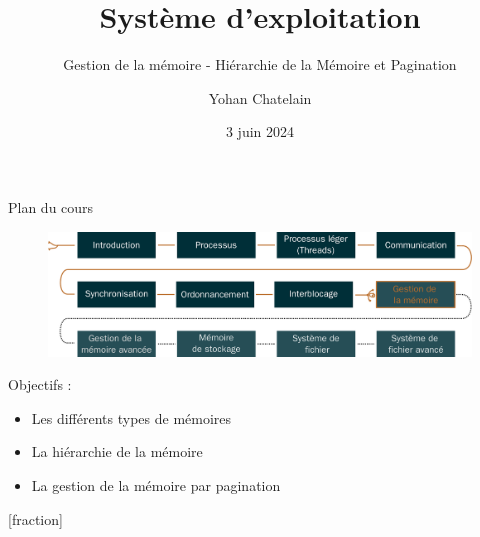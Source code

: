\documentclass[8pt]{beamer}
\title{Système d'exploitation}
\subtitle{Gestion de la mémoire - Hiérarchie de la Mémoire et Pagination}
\author{Yohan Chatelain}
\institute{Polytechnique Montr\'eal}
\date{3 juin 2024}
\begin{document}
\begin{frame}
    \titlepage
\end{frame}

\begin{frame}{Plan du cours}
    \begin{figure}
        \centering
        \includegraphics[width=\textwidth]{figures/plan_cours.pdf}
    \end{figure}
    \vfill
    \begin{block}{Objectifs : }

        \begin{itemize}
            \item Les différents types de mémoires
            \item La hiérarchie de la mémoire
            \item La gestion de la mémoire par pagination
        \end{itemize}
    \end{block}
\end{frame}

\addtocounter{framenumber}{-2}
[fraction]
\end{document}
